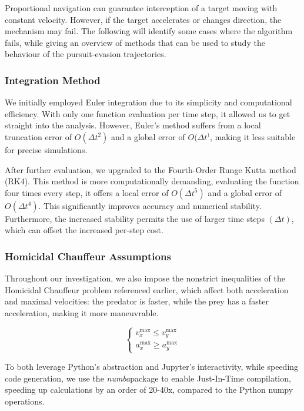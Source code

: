 \documentclass[11pt, twocolumn]{article}
\begin{document}
    Proportional navigation can guarantee interception of a target moving with constant velocity. However, if the target accelerates or changes direction, the mechanism may fail. The following will identify some cases where the algorithm fails, while giving an overview of methods that can be used to study the behaviour of the pursuit-evasion trajectories.

    \subsubsection{Integration Method}
    We initially employed Euler integration due to its simplicity and computational efficiency. With only one function evaluation per time step, it allowed us to get straight into the analysis. However, Euler's method suffers from a local truncation error of $O(\Delta t^2)$ and a global error of $O(\Delta t^)$, making it less suitable for precise simulations.

    After further evaluation, we upgraded to the Fourth-Order Runge Kutta method (RK4). This method is more computationally demanding, evaluating the function four times every step, it offers a local error of $O(\Delta t^5)$ and a global error of $O(\Delta t^4)$. This significantly improves accuracy and numerical stability. Furthermore, the increased stability permits the use of larger time steps $(\Delta t)$, which can offset the increased per-step cost.

    \subsubsection{Homicidal Chauffeur Assumptions}
    Throughout our investigation, we also impose the nonstrict inequalities of the Homicidal Chauffeur problem referenced earlier, which affect both acceleration and maximal velocities: the predator is faster, while the prey has a faster acceleration, making it more maneuvrable.

    \[
      \left\{
        \begin{aligned}
          v^{\text{max}}_x \leq v^{\text{max}}_y \\
          a^{\text{max}}_x \geq a^{\text{max}}_y
        \end{aligned}
        \right.
      \]

      To both leverage Python's abstraction and Jupyter's interactivity, while speeding code generation, we use the \textit{numba}package to enable Just-In-Time compilation, speeding up calculations by an order of 20-40x, compared to the Python numpy operations.
\end{document}
